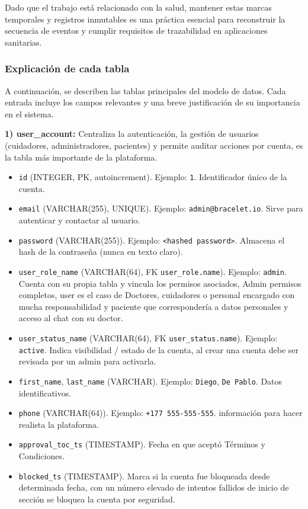 \documentclass[12pt, a4paper]{article}
\begin{document}
Dado que el trabajo está relacionado con la salud, mantener estas marcas temporales y registros inmutables es una práctica esencial para reconstruir la secuencia de eventos y cumplir requisitos de trazabilidad en aplicaciones sanitarias.

\subsubsection{Explicación de cada tabla}
A continuación, se describen las tablas principales del modelo de datos.  
Cada entrada incluye los campos relevantes y una breve justificación de su importancia en el sistema.



\textbf{1) user\_account:} Centraliza la autenticación, la gestión de usuarios (cuidadores, administradores, pacientes) y permite auditar acciones por cuenta, es la tabla más importante de la plataforma.


\begin{itemize}
	\item \texttt{id} (INTEGER, PK, autoincrement). Ejemplo: \texttt{1}. Identificador único de la cuenta.
	\item \texttt{email} (VARCHAR(255), UNIQUE). Ejemplo: \texttt{admin@bracelet.io}. Sirve para autenticar y contactar al usuario.
	\item \texttt{password} (VARCHAR(255)). Ejemplo: \texttt{\textless hashed password\textgreater}. Almacena el hash de la contraseña (nunca en texto claro).
	\item \texttt{user\_role\_name} (VARCHAR(64), FK \texttt{user\_role.name}). Ejemplo: \texttt{admin}. Cuenta con su propia tabla y vincula los permisos asociados, Admin permisos completos, user es el caso de Doctores, cuidadores o personal encargado con mucha responsabilidad y paciente que correspondería a datos personales y acceso al chat con su doctor.
	\item \texttt{user\_status\_name} (VARCHAR(64), FK \texttt{user\_status.name}). Ejemplo: \texttt{active}. Indica visibilidad / estado de la cuenta, al crear una cuenta debe ser revisada por un admin para activarla.
	\item \texttt{first\_name}, \texttt{last\_name} (VARCHAR). Ejemplo: \texttt{Diego}, \texttt{De Pablo}. Datos identificativos.
	\item \texttt{phone} (VARCHAR(64)). Ejemplo: \texttt{+177 555-555-555}. información para hacer realista la plataforma.
	\item \texttt{approval\_toc\_ts} (TIMESTAMP). Fecha en que aceptó Términos y Condiciones.
	\item \texttt{blocked\_ts} (TIMESTAMP). Marca si la cuenta fue bloqueada desde determinada fecha, con un número elevado de intentos fallidos de inicio de sección se bloquea la cuenta por seguridad.
\end{itemize}
\end{document}
